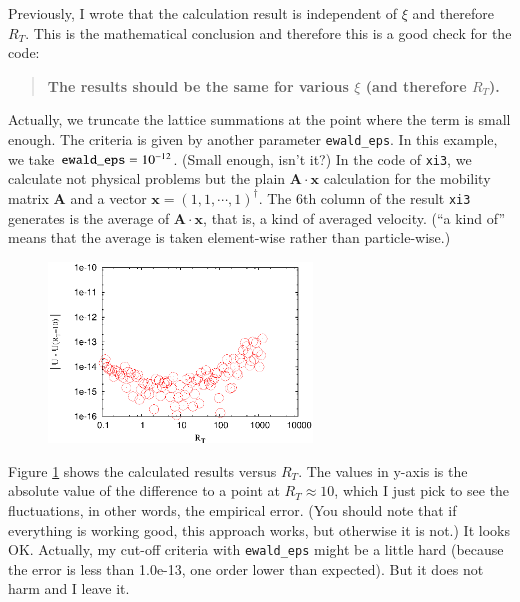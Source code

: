 \documentclass{book}
\begin{document}
Previously, I wrote that
the calculation result is independent of $\xi$ and therefore $R_T$.
This is the mathematical conclusion and therefore this is a good 
check for the code:
\begin{quote}
  {\bf The results should be the same for various $\xi$ (and therefore $R_T$).}
\end{quote}
Actually, we truncate the lattice summations at the point where
the term is small enough. The criteria is given by another parameter
{\tt ewald\_eps}.
In this example, we take ${\tt ewald\_eps} = 10^{-12}$.
(Small enough, isn't it?)
In the code of {\tt xi3}, we calculate not physical problems
but the plain $\mathbf{A}\cdot\mathbf{x}$ calculation
for the mobility matrix $\mathbf{A}$ and
a vector $\mathbf{x} = (1,1,\cdots,1)^\dagger$.
The 6th column of the result {\tt xi3} generates
is the average of $\mathbf{A}\cdot\mathbf{x}$, that is,
a kind of averaged velocity. (``a kind of'' means
that the average is taken element-wise rather than particle-wise.)
\begin{figure}
  \centering
  \includegraphics[width=7cm]{figures/FIG-xi3-err}
  \caption{
  }
  \label{fig:xi3-err}
\end{figure}
Figure \ref{fig:xi3-err} shows the calculated results versus $R_T$.
The values in y-axis is the absolute value of the difference
to a point at $R_T \approx 10$, which I just pick to see the 
fluctuations, in other words, the empirical error. (You should 
note that if everything is working good, this approach works,
but otherwise it is not.)
It looks OK.
Actually, my cut-off criteria with {\tt ewald\_eps} might be 
a little hard (because the error is less than 1.0e-13, one order 
lower than expected). But it does not harm and I leave it.
\end{document}
